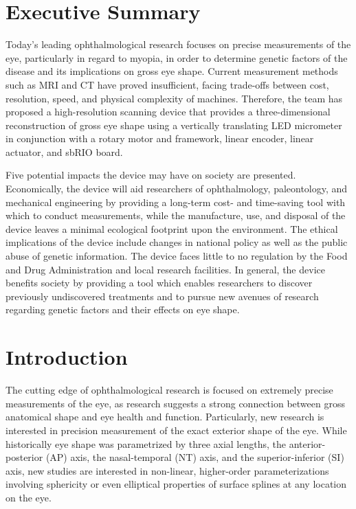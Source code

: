 \documentclass{article}
\begin{document}
 
 
\setcounter{tocdepth}{2}
\tableofcontents
\newpage
 
 
\section*{Executive Summary}
\label{sec:exec-summary}
 
Today's leading ophthalmological research focuses on precise
measurements of the eye, particularly in regard to myopia, in order to
determine genetic factors of the disease and its implications on gross
eye shape. Current measurement methods such as MRI and CT have proved
insufficient, facing trade-offs between cost, resolution, speed, and
physical complexity of machines. Therefore, the team has proposed a
high-resolution scanning device that provides a three-dimensional
reconstruction of gross eye shape using a vertically translating LED
micrometer in conjunction with a rotary motor and framework, linear
encoder, linear actuator, and sbRIO board.

Five potential impacts the device may have on society are
presented. Economically, the device will aid researchers of
ophthalmology, paleontology, and mechanical engineering by providing a
long-term cost- and time-saving tool with which to conduct
measurements, while the manufacture, use, and disposal of the device
leaves a minimal ecological footprint upon the environment. The
ethical implications of the device include changes in national policy
as well as the public abuse of genetic information. The device faces
little to no regulation by the Food and Drug Administration and local
research facilities. In general, the device benefits society by
providing a tool which enables researchers to discover previously
undiscovered treatments and to pursue new avenues of research
regarding genetic factors and their effects on eye shape.


\newpage
 
  
\section{Introduction}
\label{sec:Introduction}
 
The cutting edge of ophthalmological research is focused on extremely
precise measurements of the eye, as research suggests a strong
connection between gross anatomical shape and eye health and
function. Particularly, new research is interested in precision
measurement of the exact exterior shape of the
eye\cite{atchison04,zhou99:genes,zhou99:models,guggenheim04,wallman04}. While
historically eye shape was parametrized by three axial lengths, the
anterior-posterior (AP) axis, the nasal-temporal (NT) axis, and the
superior-inferior (SI) axis, new studies are interested in non-linear,
higher-order parameterizations involving sphericity or even elliptical
properties of surface splines at any location on the eye.
 
\end{document}
